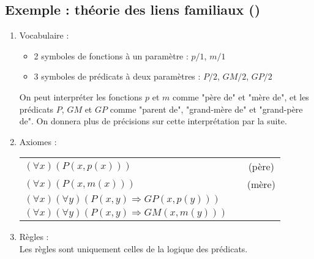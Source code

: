 \subsection{Exemple : théorie des liens familiaux ()}
\begin{enumerate}
\item Vocabulaire : 
\begin{itemize}
\item 2 symboles de fonctions à un paramètre : $p/1$, $m/1$
\item 3 symboles de prédicats à deux paramètres : $P/2$, $GM/2$, $GP/2$\\
\end{itemize}

On peut interpréter les fonctions $p$ et $m$ comme "père de" et "mère de", et les prédicats $P$, $GM$ et $GP$ comme "parent de", "grand-mère de" et "grand-père de". On donnera plus de précisions sur cette interprétation par la suite.\\

\item Axiomes : \\
\begin{center}
\begin{tabular}{lcc}
$(\forall x) \left(P(x,p(x))\right)$ & \hspace*{2cm}& (père)\\
$(\forall x) \left(P(x,m(x))\right)$ & \hspace*{2cm}& (mère)\\
$(\forall x)(\forall y) \left(P(x,y)\Rightarrow GP(x,p(y)) \right)$&&\\
$(\forall x)(\forall y) \left(P(x,y)\Rightarrow GM(x,m(y)) \right)$&&\\
\end{tabular}
\end{center}

\item Règles : \\
Les règles sont uniquement celles de la logique des prédicats.
\end{enumerate}

